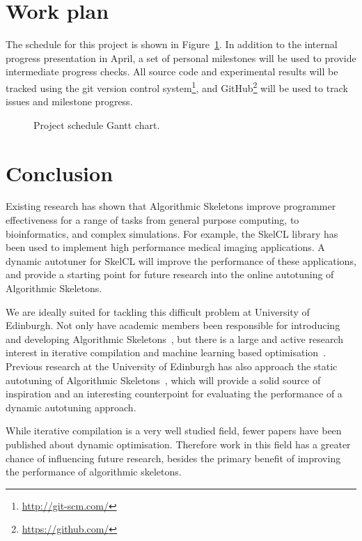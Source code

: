 \section{Work plan}
The schedule for this project is shown in Figure~\ref{fig:gantt}. In
addition to the internal progress presentation in April, a set of
personal milestones will be used to provide intermediate progress
checks. All source code and experimental results will be tracked using
the git version control system\footnote{\url{http://git-scm.com/}},
and GitHub\footnote{\url{https://github.com/}} will be used to track
issues and milestone progress.

\begin{figure}[b]
\makebox[\textwidth][c]{}
\caption{Project schedule Gantt chart.}
\label{fig:gantt}
\end{figure}

\section{Conclusion}
Existing research has shown that Algorithmic Skeletons improve
programmer effectiveness for a range of tasks from general purpose
computing, to bioinformatics, and complex simulations. For example,
the SkelCL library has been used to implement high performance medical
imaging applications. A dynamic autotuner for SkelCL will improve the
performance of these applications, and provide a starting point for
future research into the online autotuning of Algorithmic Skeletons.

We are ideally suited for tackling this difficult problem at
University of Edinburgh. Not only have academic members been
responsible for introducing and developing Algorithmic
Skeletons~\cite{Cole1989, Cole2004, Benoit2005a}, but there is a large
and active research interest in iterative compilation and machine
learning based optimisation~\cite{Fursin2008, Agakov,
Fursin2005}. Previous research at the University of Edinburgh has also
approach the static autotuning of Algorithmic
Skeletons~\cite{Collins2012, Collins2013}, which will provide a solid
source of inspiration and an interesting counterpoint for evaluating
the performance of a dynamic autotuning approach.

While iterative compilation is a very well studied field, fewer papers
have been published about dynamic optimisation. Therefore work in this
field has a greater chance of influencing future research, besides the
primary benefit of improving the performance of algorithmic skeletons.


